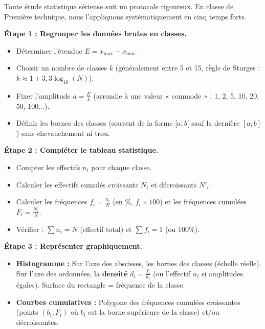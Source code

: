 \documentclass[11pt]{article}
\begin{document}
Toute étude statistique sérieuse suit un protocole rigoureux. En classe de Première technique, nous l'appliquons systématiquement en cinq temps forts.

\begin{methode}
\textbf{Étape 1 : Regrouper les données brutes en classes.}
\begin{itemize}
    \item Déterminer l'étendue $E = x_{\max} - x_{\min}$.
    \item Choisir un nombre de classes $k$ (généralement entre 5 et 15, règle de Sturges : $k \approx 1 + 3,3 \log_{10}(N)$).
    \item Fixer l'amplitude $a = \frac{E}{k}$ (arrondie à une valeur « commode » : 1, 2, 5, 10, 20, 50, 100...).
    \item Définir les bornes des classes (souvent de la forme $[a ; b[$ sauf la dernière $[a ; b]$) sans chevauchement ni trou.
\end{itemize}

\textbf{Étape 2 : Compléter le tableau statistique.}
\begin{itemize}
    \item Compter les effectifs $n_i$ pour chaque classe.
    \item Calculer les effectifs cumulés croissants $N_i$ et décroissants $N'_i$.
    \item Calculer les fréquences $f_i = \frac{n_i}{N}$ (en \%, $f_i \times 100$) et les fréquences cumulées $F_i = \frac{N_i}{N}$.
    \item Vérifier : $\sum n_i = N$ (effectif total) et $\sum f_i = 1$ (ou 100\%).
\end{itemize}

\textbf{Étape 3 : Représenter graphiquement.}
\begin{itemize}
    \item \textbf{Histogramme :} Sur l'axe des abscisses, les bornes des classes (échelle réelle). Sur l'axe des ordonnées, la \textbf{densité} $d_i = \frac{f_i}{a_i}$ (ou l'effectif $n_i$ si amplitudes égales). Surface du rectangle = fréquence de la classe.
    \item \textbf{Courbes cumulatives :} Polygone des fréquences cumulées croissantes (points $(b_i ; F_i)$ où $b_i$ est la borne supérieure de la classe) et/ou décroissantes.
\end{itemize}


\end{methode}
\end{document}
